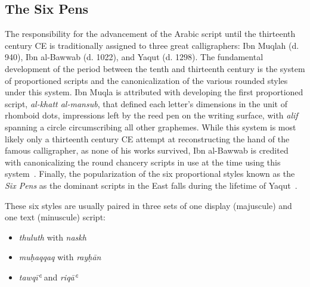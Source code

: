\subsection{The Six Pens}

The responsibility for the advancement of the Arabic script until the
thirteenth century CE is traditionally assigned to three great calligraphers:
Ibn Muqlah (d. 940), Ibn al-Bawwab (d. 1022), and Yaqut (d. 1298). The
fundamental development of the period between the tenth and thirteenth century
is the system of proportioned scripts and the canonicalization of the various
rounded styles under this system. Ibn Muqla is attributed with developing the
first proportioned script, \emph{al-khatt al-mansub}, that defined each
letter's dimensions in the unit of rhomboid dots, impressions left by the reed
pen on the writing surface, with \emph{alif} spanning a circle circumscribing
all other graphemes. While this system is most likely only a thirteenth century
CE attempt at reconstructing the hand of the famous calligrapher, as none of
his works survived, Ibn al-Bawwab is credited with canonicalizing the round
chancery scripts in use at the time using this system~\cite[pg. 158-160,
213]{blair2006islamic}. Finally, the popularization of the six proportional
styles known as the \emph{Six Pens} as the dominant scripts in the East falls
during the lifetime of Yaqut~\cite[pg. 251]{gacek2009arabic}.

These six styles are usually paired in three sets of one display (majuscule)
and one text (minuscule) script:

\begin{itemize}
	\item \emph{thuluth} with \emph{naskh}
	\item \emph{muḥaqqaq} with \emph{rayḥān}
	\item \emph{tawqīʿ} and \emph{riqāʿ}
\end{itemize}

